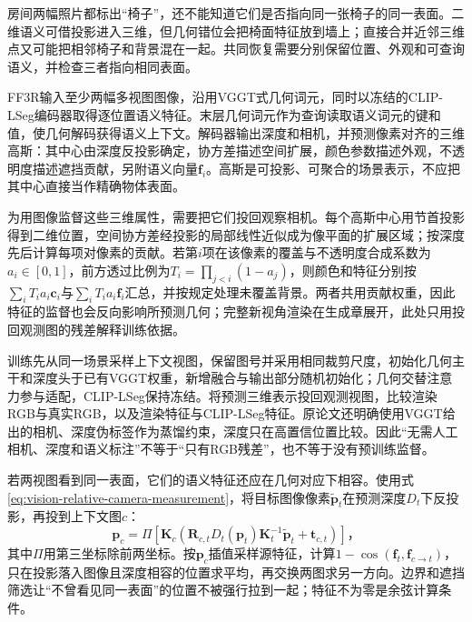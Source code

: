 房间两幅照片都标出“椅子”，还不能知道它们是否指向同一张椅子的同一表面。二维语义可借投影进入三维，但几何错位会把椅面特征放到墙上；直接合并近邻三维点又可能把相邻椅子和背景混在一起。共同恢复需要分别保留位置、外观和可查询语义，并检查三者指向相同表面。

FF3R输入至少两幅多视图图像，沿用VGGT式几何词元，同时以冻结的CLIP-LSeg编码器取得逐位置语义特征。末层几何词元作为查询读取语义词元的键和值，使几何解码获得语义上下文。解码器输出深度和相机，并预测像素对齐的三维高斯：其中心由深度反投影确定，协方差描述空间扩展，颜色参数描述外观，不透明度描述遮挡贡献，另附语义向量$\bm{f}_i$。高斯是可投影、可聚合的场景表示，不应把其中心直接当作精确物体表面。

为用图像监督这些三维属性，需要把它们投回观察相机。每个高斯中心用节首投影得到二维位置，空间协方差经投影的局部线性近似成为像平面的扩展区域；按深度先后计算每项对像素的贡献。若第$i$项在该像素的覆盖与不透明度合成系数为$a_i\in[0,1]$，前方透过比例为$T_i=\prod_{j<i}(1-a_j)$，则颜色和特征分别按$\sum_iT_i a_i\bm c_i$与$\sum_iT_i a_i\bm f_i$汇总，并按规定处理未覆盖背景。两者共用贡献权重，因此特征的监督也会反向影响所预测几何；完整新视角渲染在生成章展开，此处只用投回观测图的残差解释训练依据。

训练先从同一场景采样上下文视图，保留图号并采用相同裁剪尺度，初始化几何主干和深度头于已有VGGT权重，新增融合与输出部分随机初始化；几何交替注意力参与适配，CLIP-LSeg保持冻结。将预测三维表示投回观测视图，比较渲染RGB与真实RGB，以及渲染特征与CLIP-LSeg特征。原论文还明确使用VGGT给出的相机、深度伪标签作为蒸馏约束，深度只在高置信位置比较。因此“无需人工相机、深度和语义标注”不等于“只有RGB残差”，也不等于没有预训练监督。

若两视图看到同一表面，它们的语义特征还应在几何对应下相容。使用式\eqref{eq:vision-relative-camera-measurement}，将目标图像像素$\tilde{\bm{p}}_t$在预测深度$D_t$下反投影，再投到上下文图$c$：
\begin{equation}
 \bm{p}_c=
 \Pi\!\left[
 \bm{K}_c\left(
 \bm{R}_{c,t}D_t(\bm{p}_t)\bm{K}_t^{-1}\tilde{\bm{p}}_t
 +\bm{t}_{c,t}\right)\right]\text{，}
 \label{eq:vision-ff3r-warp}
\end{equation}
其中$\Pi$用第三坐标除前两坐标。按$\bm{p}_c$插值采样源特征，计算$1-\cos(\bm{f}_t,\bm{f}_{c\to t})$，只在投影落入图像且深度相容的位置求平均，再交换两图求另一方向。边界和遮挡筛选让“不曾看见同一表面”的位置不被强行拉到一起；特征不为零是余弦计算条件。

